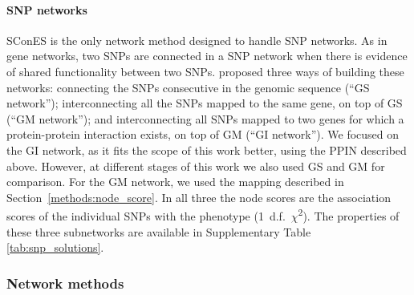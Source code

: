 \documentclass[10pt,letterpaper]{article}
\begin{document}
\paragraph{SNP networks}
SConES \cite{azencott_efficient_2013} is the only network method designed to handle SNP networks. As in gene networks, two SNPs are connected in a SNP network when there is evidence of shared functionality between two SNPs. \citet{azencott_efficient_2013} proposed three ways of building these networks: connecting the SNPs consecutive in the genomic sequence (``GS network''); interconnecting all the SNPs mapped to the same gene, on top of GS (``GM network''); and interconnecting all SNPs mapped to two genes for which a protein-protein interaction exists, on top of GM (``GI network''). We focused on the GI network, as it fits the scope of this work better, using the PPIN described above. However, at different stages of this work we also used GS and GM for comparison. For the GM network, we used the mapping described in Section~\ref{methods:node_score}. In all three the node scores are the association scores of the individual SNPs with the phenotype (1~d.f.~\(\chi\)\textsuperscript{2}). The properties of these three subnetworks are available in Supplementary Table \ref{tab:snp_solutions}.

\subsubsection{Network methods}
\label{methods:methods}
\end{document}
